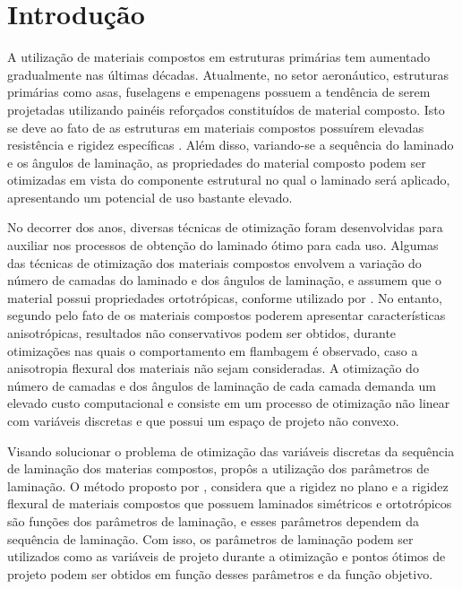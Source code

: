 \chapter[Introdução]{Introdução}

A utilização de materiais compostos em estruturas primárias tem aumentado gradualmente nas últimas décadas. Atualmente, no setor aeronáutico, estruturas primárias como asas, fuselagens e empenagens possuem a tendência de serem projetadas utilizando painéis reforçados constituídos de material composto. Isto se deve ao fato de as estruturas em materiais compostos possuírem elevadas resistência e rigidez específicas \cite{herencia2007optimization}. Além disso, variando-se a sequência do laminado e os ângulos de laminação, as propriedades do material composto podem ser otimizadas em vista do componente estrutural no qual o laminado será aplicado, apresentando um potencial de uso bastante elevado.

No decorrer dos anos, diversas técnicas de otimização foram desenvolvidas para auxiliar nos processos de obtenção do laminado ótimo para cada uso. Algumas das técnicas de otimização dos materiais compostos envolvem a variação do número de camadas do laminado e dos ângulos de laminação, e assumem que o material possui propriedades ortotrópicas, conforme utilizado por \cite{schmit1973optimum}. No entanto, segundo \cite{chamis1969buckling} pelo fato de os materiais compostos poderem apresentar características anisotrópicas, resultados não conservativos podem ser obtidos, durante otimizações nas quais o comportamento em flambagem é observado, caso a anisotropia flexural dos materiais não sejam consideradas. A otimização do número de camadas e dos ângulos de laminação de cada camada demanda um elevado custo computacional e consiste em um processo de otimização não linear com variáveis discretas e que possui um espaço de projeto não convexo.

Visando solucionar o problema de otimização das variáveis discretas da sequência de laminação dos materias compostos, \cite{miki1991optimum} propôs a utilização dos parâmetros de laminação. O método proposto por \cite{miki1991optimum}, considera que a rigidez no plano e a rigidez flexural de materiais compostos que possuem laminados simétricos e ortotrópicos são funções dos parâmetros de laminação, e esses parâmetros dependem da sequência de laminação. Com isso, os parâmetros de laminação podem ser utilizados como as variáveis de projeto durante a otimização e pontos ótimos de projeto podem ser obtidos em função desses parâmetros e da função objetivo.

